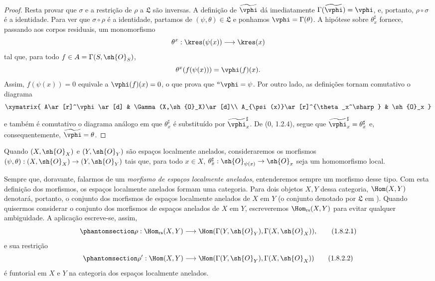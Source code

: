 \documentclass[oneside,10pt]{amsart}
\makeatletter
\newcommand{\ega@arrow}[2]{\mathchoice{#1}{#2}{#2}{#2}}
\renewcommand{\to}{\ega@arrow{\longrightarrow}{\rightarrow}}
\newcommand{\oldpage}[2][]{\marginnote{\normalfont\footnotesize\textbf{#1}~|~#2}\ignorespaces}
\let\EGAOriginalLabel\label
\renewcommand{\label}[1]{\phantomsection\EGAOriginalLabel{#1}}
\makeatother
\begin{document}
\begin{proof}
Resta provar que $\sigma$ e a restrição de $\rho$ a $\mathfrak{L}$ são
inversas. A definição de $\widetilde{\vphi}$ dá imediatamente
$\Gamma(\widetilde{\vphi})=\vphi$, e, portanto, $\rho\circ\sigma$ é a
identidade. Para ver que $\sigma\circ\rho$ é a identidade, partamos de
$(\psi,\theta)\in\mathfrak{L}$ e ponhamos $\vphi=\Gamma(\theta)$. A
hipótese sobre $\theta_x^\sharp$ fornece, passando aos corpos
residuais, um monomorfismo
\[
  \theta^x:\kres(\psi(x))\to\kres(x)
\]
tal que, para todo $f\in A=\Gamma(S,\sh{O}_S)$,
\[
  \theta^x(f(\psi(x)))=\vphi(f)(x).
\]
Assim, $f(\psi(x))=0$ equivale a $\vphi(f)(x)=0$, o que prova que
${}^a\vphi=\psi$. Por outro lado, as definições tornam comutativo o
diagrama
\[
  \xymatrix{
    A\ar[r]^\vphi\ar[d] &
    \Gamma(X,\sh{O}_X)\ar[d]\\
    A_{\psi(x)}\ar[r]^{\theta_x^\sharp} &
    \sh{O}_x
  }
\]
e também é comutativo o diagrama análogo em que $\theta_x^\sharp$ é
substituído por $\widetilde{\vphi}_x^\sharp$. De (0, 1.2.4), segue que
$\widetilde{\vphi}_x^\sharp=\theta_x^\sharp$ e, consequentemente,
$\widetilde{\vphi}=\theta$.
\end{proof}

\begin{env}[1.8.2]
\label{ega2:addendum:I.1.8.2}
Quando $(X,\sh{O}_X)$ e $(Y,\sh{O}_Y)$ são espaços localmente
anelados, consideraremos os morfismos
$(\psi,\theta):(X,\sh{O}_X)\to(Y,\sh{O}_Y)$ tais que, para todo
$x\in X$, $\theta_x^\sharp:\sh{O}_{\psi(x)}\to\sh{O}_x$ seja um
homomorfismo local.

Sempre que, doravante, falarmos de um
\oldpage[II]{219}
\emph{morfismo de espaços localmente anelados}, entenderemos sempre
um morfismo desse tipo. Com esta definição dos morfismos, os espaços
localmente anelados formam uma categoria. Para dois objetos $X,Y$
dessa categoria, $\Hom(X,Y)$ denotará, portanto, o conjunto dos
morfismos de espaços localmente anelados de $X$ em $Y$ (o conjunto
denotado por $\mathfrak{L}$ em ). Quando quisermos
considerar o conjunto dos morfismos de espaços anelados de $X$ em
$Y$, escreveremos $\Hom_{\mathrm{rs}}(X,Y)$ para evitar qualquer
ambiguidade. A aplicação  escreve-se, assim,
\begin{equation}
\label{ega2:addendum:I.1.8.2.1}
  \rho:\Hom_{\mathrm{rs}}(X,Y)
  \to\Hom(\Gamma(Y,\sh{O}_Y),\Gamma(X,\sh{O}_X)),
\tag{1.8.2.1}
\end{equation}
e sua restrição
\begin{equation}
\label{ega2:addendum:I.1.8.2.2}
  \rho':\Hom(X,Y)
  \to\Hom(\Gamma(Y,\sh{O}_Y),\Gamma(X,\sh{O}_X))
\tag{1.8.2.2}
\end{equation}
é funtorial em $X$ e $Y$ na categoria dos espaços localmente
anelados.
\end{env}
\end{document}
